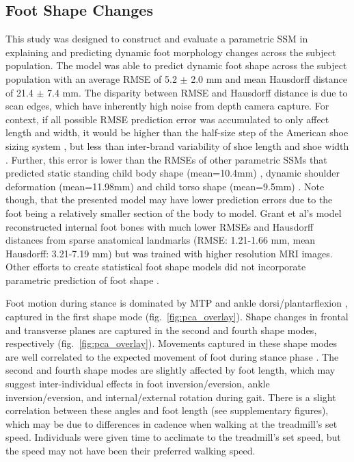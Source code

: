\documentclass[defaultstyle,11pt]{thesis}
\begin{document}
\hypertarget{foot-shape-changes}{%
\subsection{Foot Shape Changes}\label{foot-shape-changes}}

This study was designed to construct and evaluate a parametric SSM in explaining and predicting dynamic foot morphology changes across the subject population.
The model was able to predict dynamic foot shape across the subject population with an average RMSE of 5.2 \(\pm\) 2.0 mm and mean Hausdorff distance of 21.4 \(\pm\) 7.4 mm.
The disparity between RMSE and Hausdorff distance is due to scan edges, which have inherently high noise from depth camera capture.
For context, if all possible RMSE prediction error was accumulated to only affect length and width, it would be higher than the half-size step of the American shoe sizing system \citep{Luximon2013}, but less than inter-brand variability of shoe length and shoe width \citep{Wannop2019}.
Further, this error is lower than the RMSEs of other parametric SSMs that predicted static standing child body shape (mean=10.4mm) \citep{Park2015a}, dynamic shoulder deformation (mean=11.98mm) \citep{Kim2016} and child torso shape (mean=9.5mm) \citep{Park2017}.
Note though, that the presented model may have lower prediction errors due to the foot being a relatively smaller section of the body to model.
Grant et al's model reconstructed internal foot bones with much lower RMSEs and Hausdorff distances from sparse anatomical landmarks (RMSE: 1.21-1.66 mm, mean Hausdorff: 3.21-7.19 mm) \citep{Grant2020} but was trained with higher resolution MRI images.
Other efforts to create statistical foot shape models did not incorporate parametric prediction of foot shape \citep{Conrad2019, Stankovic2020}.

Foot motion during stance is dominated by MTP and ankle dorsi/plantarflexion \citep{Leardini2007}, captured in the first shape mode (fig.~\ref{fig:pca_overlay}).
Shape changes in frontal and transverse planes are captured in the second and fourth shape modes, respectively (fig.~\ref{fig:pca_overlay}).
Movements captured in these shape modes are well correlated to the expected movement of foot during stance phase \citep{Leardini2007}.
The second and fourth shape modes are slightly affected by foot length, which may suggest inter-individual effects in foot inversion/eversion, ankle inversion/eversion, and internal/external rotation during gait.
There is a slight correlation between these angles and foot length (see supplementary figures), which may be due to differences in cadence when walking at the treadmill's set speed.
Individuals were given time to acclimate to the treadmill's set speed, but the speed may not have been their preferred walking speed.
\end{document}
